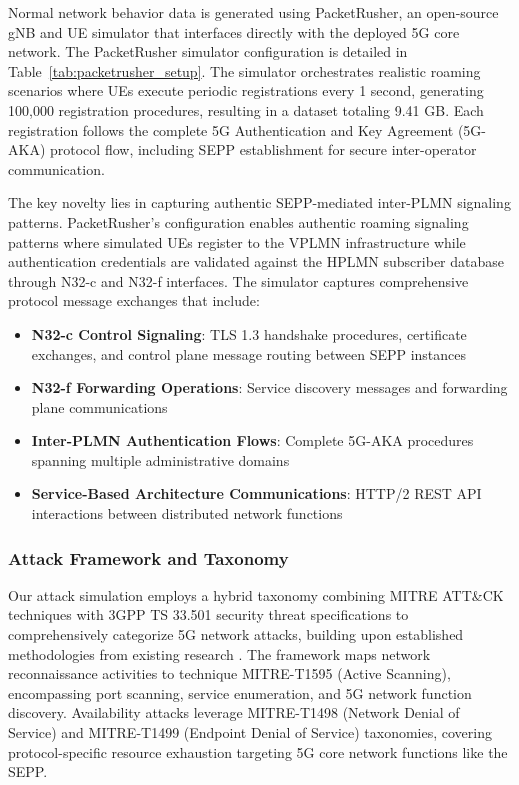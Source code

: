 \documentclass[journal,article,submit,moreauthors,pdftex]{Definitions/tsp}
\begin{document}
Normal network behavior data is generated using PacketRusher, an open-source gNB and UE simulator that interfaces directly with the deployed 5G core network. The PacketRusher simulator configuration is detailed in Table~\ref{tab:packetrusher_setup}. The simulator orchestrates realistic roaming scenarios where UEs execute periodic registrations every 1 second, generating 100,000 registration procedures, resulting in a dataset totaling 9.41 GB. Each registration follows the complete 5G Authentication and Key Agreement (5G-AKA) protocol flow, including SEPP establishment for secure inter-operator communication.

The key novelty lies in capturing authentic SEPP-mediated inter-PLMN signaling patterns. PacketRusher's configuration enables authentic roaming signaling patterns where simulated UEs register to the VPLMN infrastructure while authentication credentials are validated against the HPLMN subscriber database through N32-c and N32-f interfaces. The simulator captures comprehensive protocol message exchanges that include:


\begin{itemize}
\item \textbf{N32-c Control Signaling}: TLS 1.3 handshake procedures, certificate exchanges, and control plane message routing between SEPP instances
\item \textbf{N32-f Forwarding Operations}: Service discovery messages and forwarding plane communications
\item \textbf{Inter-PLMN Authentication Flows}: Complete 5G-AKA procedures spanning multiple administrative domains
\item \textbf{Service-Based Architecture Communications}: HTTP/2 REST API interactions between distributed network functions
\end{itemize}

\subsubsection{Attack Framework and Taxonomy}

Our attack simulation employs a hybrid taxonomy combining MITRE ATT\&CK techniques with 3GPP TS 33.501 security threat specifications to comprehensively categorize 5G network attacks, building upon established methodologies from existing research \cite{hussainDeepLearningBasedDDoSAttack2021} \cite{parkMachineLearningBased2022}. The framework maps network reconnaissance activities to technique MITRE-T1595 (Active Scanning), encompassing port scanning, service enumeration, and 5G network function discovery. Availability attacks leverage MITRE-T1498 (Network Denial of Service) and MITRE-T1499 (Endpoint Denial of Service) taxonomies, covering protocol-specific resource exhaustion targeting 5G core network functions like the SEPP.
\end{document}
